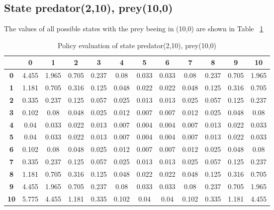 \documentclass[11pt]{article}
\begin{document}
\subsection{State predator(2,10), prey(10,0)}

The values of all possible states with the prey beeing in (10,0) are shown in Table ~\ref{state3}

\begin{center}
\begin{table}[ht]
{\small
\hfill{}
\begin{tabular}{c|c|c|c|c|c|c|c|c|c|c|c}
\textbf{} & \textbf{0} & \textbf{1} & \textbf{2} & \textbf{3} & \textbf{4} & \textbf{5} & \textbf{6} & \textbf{7} & \textbf{8} & \textbf{9} & \textbf{10}\\
	\hline
\textbf{0}& 4.455	& 1.965	& 0.705	& 0.237	& 0.08	& 0.033	& 0.033	& 0.08	& 0.237	& 0.705	& 1.965	\\
\textbf{1}& 1.181	& 0.705	& 0.316	& 0.125	& 0.048	& 0.022	& 0.022	& 0.048	& 0.125	& 0.316	& 0.705	\\
\textbf{2}& 0.335	& 0.237	& 0.125	& 0.057	& 0.025	& 0.013	& 0.013	& 0.025	& 0.057	& 0.125	& 0.237	\\
\textbf{3}& 0.102	& 0.08	& 0.048	& 0.025	& 0.012	& 0.007	& 0.007	& 0.012	& 0.025	& 0.048	& 0.08	\\
\textbf{4}& 0.04	& 0.033	& 0.022	& 0.013	& 0.007	& 0.004	& 0.004	& 0.007	& 0.013	& 0.022	& 0.033	\\
\textbf{5}& 0.04	& 0.033	& 0.022	& 0.013	& 0.007	& 0.004	& 0.004	& 0.007	& 0.013	& 0.022	& 0.033	\\
\textbf{6}& 0.102	& 0.08	& 0.048	& 0.025	& 0.012	& 0.007	& 0.007	& 0.012	& 0.025	& 0.048	& 0.08	\\
\textbf{7}& 0.335	& 0.237	& 0.125	& 0.057	& 0.025	& 0.013	& 0.013	& 0.025	& 0.057	& 0.125	& 0.237	\\
\textbf{8}& 1.181	& 0.705	& 0.316	& 0.125	& 0.048	& 0.022	& 0.022	& 0.048	& 0.125	& 0.316	& 0.705	\\
\textbf{9}& 4.455	& 1.965	& 0.705	& 0.237	& 0.08	& 0.033	& 0.033	& 0.08	& 0.237	& 0.705	& 1.965	\\
\textbf{10}& 5.775	& 4.455	& 1.181	& 0.335	& 0.102	& 0.04	& 0.04	& 0.102	& 0.335	& 1.181	& 4.455	\\
\end{tabular}}
\hfill{}
\caption{Policy evaluation of state predator(2,10), prey(10,0)}
\label{state3}
\end{table}
\end{center}	
\end{document}
